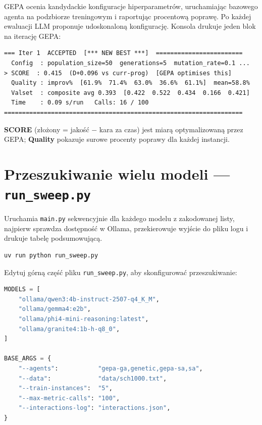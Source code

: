 \documentclass[11pt,a4paper]{article}
\begin{document}
GEPA ocenia kandydackie konfiguracje hiperparametrów, uruchamiając bazowego
agenta na podzbiorze treningowym i raportując procentową poprawę.
Po każdej ewaluacji LLM proponuje udoskonaloną konfigurację.
Konsola drukuje jeden blok na iterację GEPA:

\begin{lstlisting}
=== Iter 1  ACCEPTED  [*** NEW BEST ***]  ========================
  Config  : population_size=50  generations=5  mutation_rate=0.1 ...
> SCORE  : 0.415  (D+0.096 vs curr-prog)  [GEPA optimises this]
  Quality : improv%  [61.9%  71.4%  63.0%  36.6%  61.1%]  mean=58.8%
  Valset  : composite avg 0.393  [0.422  0.522  0.434  0.166  0.421]
  Time    : 0.09 s/run   Calls: 16 / 100
==================================================================
\end{lstlisting}

\textbf{SCORE} (złożony = jakość $-$ kara za czas) jest miarą optymalizowaną
przez GEPA; \textbf{Quality} pokazuje surowe procenty poprawy dla każdej instancji.

\section{Przeszukiwanie wielu modeli --- \texttt{run\_sweep.py}}

Uruchamia \texttt{main.py} sekwencyjnie dla każdego modelu z zakodowanej listy,
najpierw sprawdza dostępność w Ollama, przekierowuje wyjście do pliku logu
i drukuje tabelę podsumowującą.

\begin{lstlisting}[language=bash]
uv run python run_sweep.py
\end{lstlisting}

Edytuj górną część pliku \texttt{run\_sweep.py}, aby skonfigurować przeszukiwanie:

\begin{lstlisting}[language=Python]
MODELS = [
    "ollama/qwen3:4b-instruct-2507-q4_K_M",
    "ollama/gemma4:e2b",
    "ollama/phi4-mini-reasoning:latest",
    "ollama/granite4:1b-h-q8_0",
]

BASE_ARGS = {
    "--agents":           "gepa-ga,genetic,gepa-sa,sa",
    "--data":             "data/sch1000.txt",
    "--train-instances":  "5",
    "--max-metric-calls": "100",
    "--interactions-log": "interactions.json",
}
\end{lstlisting}
\end{document}

